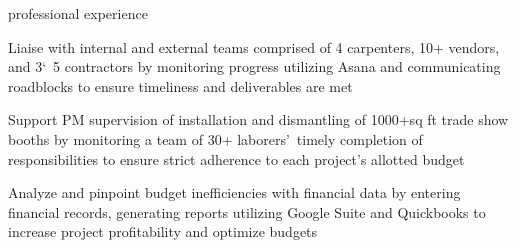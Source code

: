 \documentclass{resume} %
\begin{document}
\begin{rSection}{professional experience}
\begin{rPlace}
			\begin{rItems}
				\item {Liaise with internal and external teams comprised of 4 carpenters, 10+ vendors, and 3\char`~5 contractors by monitoring progress utilizing Asana and communicating roadblocks to ensure timeliness and deliverables are met}
				\item {Support PM supervision of installation and dismantling of 1000+sq ft trade show booths by monitoring a team of 30+ laborers\rq\ timely completion of responsibilities to ensure strict adherence to each project\rq s allotted budget}
				\item {Analyze and pinpoint budget inefficiencies with financial data by entering financial records, generating reports utilizing Google Suite and Quickbooks to increase project profitability and optimize budgets}
			\end{rItems}
		\end{rPlace}
	\end{rSection}
\end{document}
